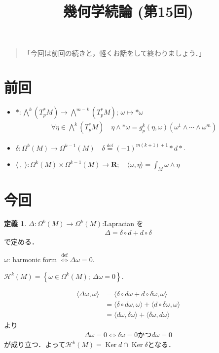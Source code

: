 \documentclass[12pt, a4paper, dvipdfmx, draft]{jsarticle}
\theoremstyle{definition}
\newtheorem*{Definition*}{定義}
\newcommand{\rr}{\mathbf{R}}
\newcommand{\mcal}{\mathcal}
\newcommand{\Ker}{\mathop{\mathrm{Ker}}\nolimits}
\theoremstyle{mystyle}
\numberwithin{equation}{section} %
\def\inner<#1>{\langle #1 \rangle}
\begin{document}
\title{幾何学続論 (第15回)}
\author{}
\date{}

\maketitle
\begin{quote}
「今回は前回の続きと，軽くお話をして終わりましょう．」
\end{quote}
\section*{前回}
\begin{itemize}
    \item $\ast \colon \bigwedge^{k}(T_p^{\ast}M)\to \bigwedge^{m-k}(T_p^{\ast}M)$; $\omega\mapsto{\ast}\omega$ 
    \begin{align*}
        \forall\eta\in\bigwedge^{k}(T_p^{\ast}M)\quad \eta\wedge\ast\omega = g_{p}^{k}(\eta,\omega)(\omega^{1}\wedge\cdots\wedge\omega^{m})
    \end{align*}
    \item $\delta\colon\Omega^{k}(M)\to\Omega^{k-1}(M)\quad \delta\overset{\text{def}}{=}(-1)^{m(k+1)+1}\ast d\ast$.
    \item $\langle\ ,\ \rangle\colon\Omega^{k}(M)\times\Omega^{k-1}(M)\to\rr;\quad \inner<\omega,\eta>=\int_{M}\omega\wedge\eta$
\end{itemize}
\section*{今回}
\begin{Definition*}
    $\Delta\colon \Omega^{k}(M)\to\Omega^{k}(M)$:Lapracian を
    \begin{align*}
        \Delta = \delta\circ d + d\circ\delta
    \end{align*}
    で定める．

    $\omega$: harmonic form $\overset{\text{def}}{\Leftrightarrow}\Delta\omega=0$.
    
    $\mathcal{H}^{k}(M)=\left\{\omega\in\Omega^{k}(M);\ \Delta\omega=0\right\}$.
\end{Definition*}
\begin{align*}
    \inner<\Delta\omega,\omega> 
    &= \inner<\delta\circ d\omega+d\circ\delta\omega,\omega>\\
    &= \inner<\delta\circ d\omega,\omega>+\inner<d\circ\delta\omega,\omega>\\
    &= \inner<d\omega,\delta\omega>+\inner<\delta\omega,d\omega>
\end{align*}
より
\begin{align*}
    \Delta\omega=0\Longleftrightarrow \delta\omega=0\text{かつ}d\omega=0
\end{align*}
が成り立つ．よって$\mcal{H}^{k}(M)=\Ker d\cap\Ker \delta$となる．
\end{document}
